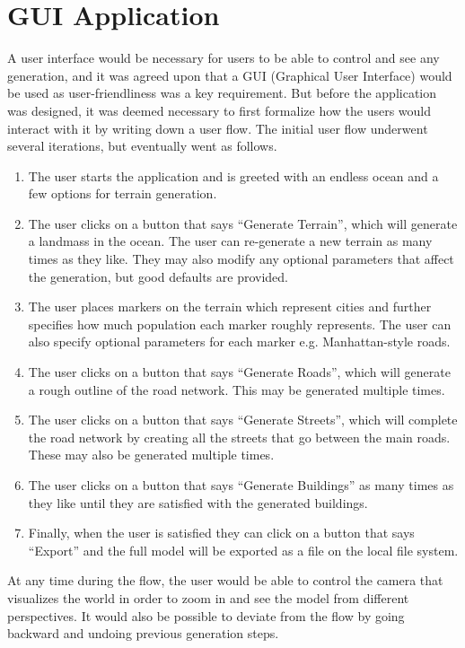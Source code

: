\section{GUI Application}

A user interface would be necessary for users to be able to control and see any generation, and it was agreed upon that a GUI (Graphical User Interface) would be used as user-friendliness was a key requirement.
But before the application was designed, it was deemed necessary to first formalize how the users would interact with it by writing down a user flow.
The initial user flow underwent several iterations, but eventually went as follows.

\begin{enumerate}
\item The user starts the application and is greeted with an endless ocean and a few options for terrain generation.
\item The user clicks on a button that says “Generate Terrain”, which will generate a landmass in the ocean. The user can re-generate a new terrain as many times as they like. They may also modify any optional parameters that affect the generation, but good defaults are provided.
\item The user places markers on the terrain which represent cities and further specifies how much population each marker roughly represents. The user can also specify optional parameters for each marker e.g. Manhattan-style roads.
\item The user clicks on a button that says “Generate Roads”, which will generate a rough outline of the road network. This may be generated multiple times.
\item The user clicks on a button that says “Generate Streets”, which will complete the road network by creating all the streets that go between the main roads. These may also be generated multiple times.
\item The user clicks on a button that says “Generate Buildings” as many times as they like until they are satisfied with the generated buildings.
\item Finally, when the user is satisfied they can click on a button that says “Export” and the full model will be exported as a file on the local file system.
\end{enumerate}

At any time during the flow, the user would be able to control the camera that visualizes the world in order to zoom in and see the model from different perspectives.
It would also be possible to deviate from the flow by going backward and undoing previous generation steps.

